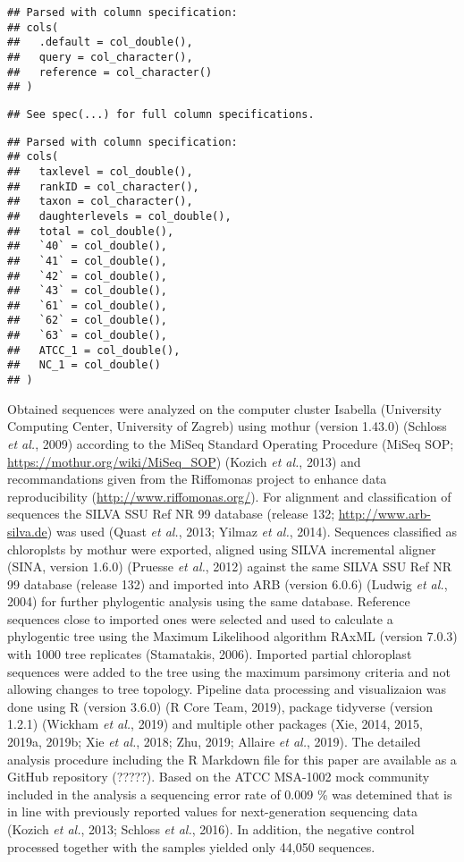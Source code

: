 \documentclass[12pt,]{article}
\begin{document}
\begin{verbatim}
## Parsed with column specification:
## cols(
##   .default = col_double(),
##   query = col_character(),
##   reference = col_character()
## )
\end{verbatim}

\begin{verbatim}
## See spec(...) for full column specifications.
\end{verbatim}

\begin{verbatim}
## Parsed with column specification:
## cols(
##   taxlevel = col_double(),
##   rankID = col_character(),
##   taxon = col_character(),
##   daughterlevels = col_double(),
##   total = col_double(),
##   `40` = col_double(),
##   `41` = col_double(),
##   `42` = col_double(),
##   `43` = col_double(),
##   `61` = col_double(),
##   `62` = col_double(),
##   `63` = col_double(),
##   ATCC_1 = col_double(),
##   NC_1 = col_double()
## )
\end{verbatim}

Obtained sequences were analyzed on the computer cluster Isabella
(University Computing Center, University of Zagreb) using mothur
(version 1.43.0) (Schloss \emph{et al.}, 2009) according to the MiSeq
Standard Operating Procedure (MiSeq SOP;
\url{https://mothur.org/wiki/MiSeq_SOP}) (Kozich \emph{et al.}, 2013)
and recommandations given from the Riffomonas project to enhance data
reproducibility (\url{http://www.riffomonas.org/}). For alignment and
classification of sequences the SILVA SSU Ref NR 99 database (release
132; \url{http://www.arb-silva.de}) was used (Quast \emph{et al.}, 2013;
Yilmaz \emph{et al.}, 2014). Sequences classified as chloroplsts by
mothur were exported, aligned using SILVA incremental aligner (SINA,
version 1.6.0) (Pruesse \emph{et al.}, 2012) against the same SILVA SSU
Ref NR 99 database (release 132) and imported into ARB (version 6.0.6)
(Ludwig \emph{et al.}, 2004) for further phylogentic analysis using the
same database. Reference sequences close to imported ones were selected
and used to calculate a phylogentic tree using the Maximum Likelihood
algorithm RAxML (version 7.0.3) with 1000 tree replicates (Stamatakis,
2006). Imported partial chloroplast sequences were added to the tree
using the maximum parsimony criteria and not allowing changes to tree
topology. Pipeline data processing and visualizaion was done using R
(version 3.6.0) (R Core Team, 2019), package tidyverse (version 1.2.1)
(Wickham \emph{et al.}, 2019) and multiple other packages (Xie, 2014,
2015, 2019a, 2019b; Xie \emph{et al.}, 2018; Zhu, 2019; Allaire \emph{et
al.}, 2019). The detailed analysis procedure including the R Markdown
file for this paper are available as a GitHub repository (?????). Based
on the ATCC MSA-1002 mock community included in the analysis a
sequencing error rate of 0.009 \si{\percent} was detemined that is in
line with previously reported values for next-generation sequencing data
(Kozich \emph{et al.}, 2013; Schloss \emph{et al.}, 2016). In addition,
the negative control processed together with the samples yielded only
44,050 sequences.
\end{document}
